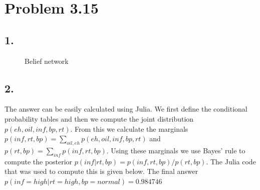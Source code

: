 \documentclass[11pt,a4paper,oneside]{report}
\begin{document}
\section*{Problem 3.15}

\subsection*{1.}
\begin{figure}[H]
  \centering
    \caption{Belief network}
    \label{fig:all_trade_cca_black}     
\end{figure}


\subsection*{2.}

The answer can be easily calculated using Julia. We first define the 
conditional probability tables and then we compute the joint distribution 
$p(eh, oil, inf, bp, rt)$. From this we calculate the marginals $p(inf,rt,bp) 
= \sum_{oil, eh}p(eh, oil, inf, bp, rt)$ and $p(rt,bp) = 
\sum_{inf}p(inf, rt, bp)$. Using these marginals we use Bayes' rule to compute 
the posterior $p(inf|rt, bp) = p(inf, rt, bp)/p(rt, bp)$. The Julia code that 
was used to compute this is given below. The final answer $p(inf = high | rt 
= high, bp = normal) = 0.984746 $\\
\end{document}
